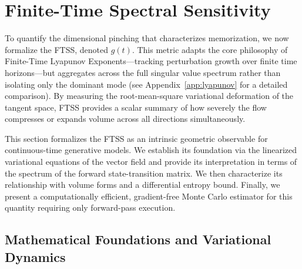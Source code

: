 \documentclass[11pt]{article}
\begin{document}
\section{Finite-Time Spectral Sensitivity}
\label{sec:gain}

To quantify the dimensional pinching that characterizes memorization, we now 
formalize the FTSS, denoted $g(t)$. This metric adapts the core philosophy of 
Finite-Time Lyapunov Exponents---tracking perturbation growth over finite time 
horizons---but aggregates across the full singular value spectrum rather than 
isolating only the dominant mode (see Appendix~\ref{app:lyapunov} for a 
detailed comparison). By measuring the root-mean-square variational deformation 
of the tangent space, FTSS provides a scalar summary of how severely the flow 
compresses or expands volume across all directions simultaneously.

This section formalizes the FTSS as an intrinsic geometric observable for continuous-time generative models. We establish its foundation via the linearized variational equations of the vector field and provide its interpretation in terms of the spectrum of the forward state-transition matrix. We then characterize its relationship with volume forms and a differential entropy bound. Finally, we present a computationally efficient, gradient-free Monte Carlo estimator for this quantity requiring only forward-pass execution.

\subsection{Mathematical Foundations and Variational Dynamics}
\label{sec:definition}
\end{document}
